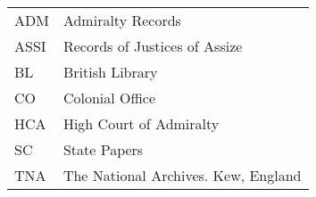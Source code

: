 \addchap{\lsAbbreviationsTitle}

\begin{tabular}{ll}
ADM &  Admiralty Records                  \\
ASSI &  Records of Justices of Assize     \\
BL &  British Library                     \\
CO &  Colonial Office                     \\
HCA &  High Court of Admiralty            \\
SC &  State Papers                        \\
TNA &  The National Archives. Kew, England\\
\end{tabular}
